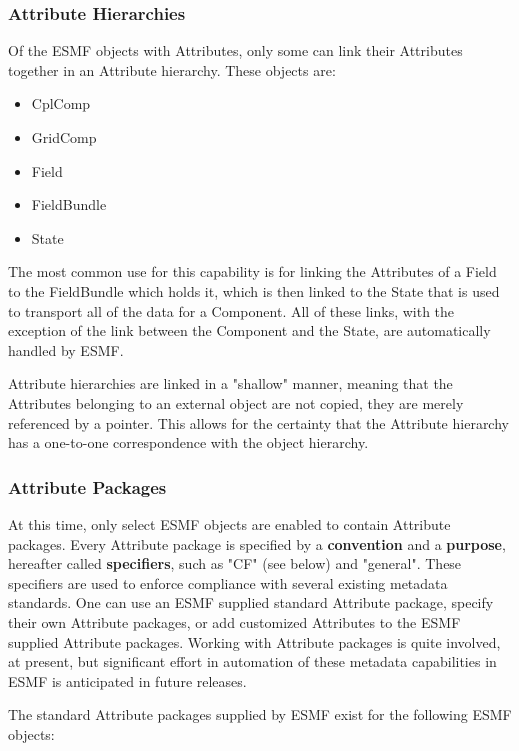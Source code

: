 \subsubsection{Attribute Hierarchies}

Of the ESMF objects with Attributes, only some can link their Attributes together in an Attribute hierarchy.  These objects are:

\begin{itemize}
\item CplComp
\item GridComp
\item Field
\item FieldBundle
\item State
\end{itemize}

The most common use for this capability is for linking the Attributes of a Field to the FieldBundle which holds it, which is then linked to the State that is used to transport all of the data for a Component.  All of these links, with the exception of the link between the Component and the State, are automatically handled by ESMF.  

Attribute hierarchies are linked in a "shallow" manner, meaning that the Attributes belonging to an external object are not copied, they are merely referenced by a pointer.  This allows for the certainty that the Attribute hierarchy has a one-to-one correspondence with the object hierarchy.  

\subsubsection{Attribute Packages}

At this time, only select ESMF objects are enabled to contain Attribute packages.  Every Attribute package is specified by a {\bf convention} and a {\bf purpose}, hereafter called {\bf specifiers}, such as "CF" (see below) and "general".  These specifiers are used to enforce compliance with several existing metadata standards.  One can use an ESMF supplied standard Attribute package, specify their own Attribute packages, or add customized Attributes to the ESMF supplied Attribute packages.  Working with Attribute packages is quite involved, at present, but significant effort in automation of these metadata capabilities in ESMF is anticipated in future releases. 

The standard Attribute packages supplied by ESMF exist for the following ESMF objects:

